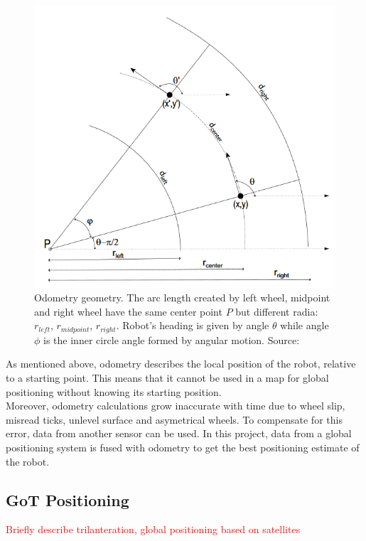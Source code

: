 \begin{figure}[H]
\includegraphics[scale=0.75]{Figures/geometry.PNG}
\centering
\caption{Odometry geometry. The arc length created by left wheel, midpoint and right wheel have the same center point $P$ but different radia: $r_{left}$, $r_{midpoint}$, $r_{right}$. Robot's heading is given by angle $\theta$ while angle $\phi$ is the inner circle angle formed by angular motion. Source: \cite{mit}}
\label{figure:geometry}
\end{figure}

As mentioned above, odometry describes the local position of the robot, relative to a starting point. This means that it cannot be used in a map for global positioning without knowing its starting position.\\

Moreover, odometry calculations grow inaccurate with time due to wheel slip, misread ticks, unlevel surface and asymetrical wheels. To compensate for this error, data from another sensor can be used. In this project, data from a global positioning system is fused with odometry to get the best positioning estimate of the robot.


\subsection{GoT Positioning}

\textcolor{red}{Briefly describe trilanteration, global positioning based on satellites}

